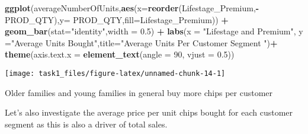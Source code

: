 \documentclass[
]{article}
\newenvironment{Shaded}{\begin{snugshade}}{\end{snugshade}}
\newcommand{\AttributeTok}[1]{\textcolor[rgb]{0.13,0.29,0.53}{#1}}
\newcommand{\DecValTok}[1]{\textcolor[rgb]{0.00,0.00,0.81}{#1}}
\newcommand{\FloatTok}[1]{\textcolor[rgb]{0.00,0.00,0.81}{#1}}
\newcommand{\FunctionTok}[1]{\textcolor[rgb]{0.13,0.29,0.53}{\textbf{#1}}}
\newcommand{\NormalTok}[1]{#1}
\newcommand{\SpecialCharTok}[1]{\textcolor[rgb]{0.81,0.36,0.00}{\textbf{#1}}}
\newcommand{\StringTok}[1]{\textcolor[rgb]{0.31,0.60,0.02}{#1}}
\begin{document}
\begin{Shaded}
\begin{Highlighting}[]
\FunctionTok{ggplot}\NormalTok{(averageNumberOfUnits,}\FunctionTok{aes}\NormalTok{(}\AttributeTok{x=}\FunctionTok{reorder}\NormalTok{(Lifestage\_Premium,}\SpecialCharTok{{-}}\NormalTok{PROD\_QTY),}\AttributeTok{y=}\NormalTok{ PROD\_QTY,}\AttributeTok{fill=}\NormalTok{Lifestage\_Premium)) }\SpecialCharTok{+}
  \FunctionTok{geom\_bar}\NormalTok{(}\AttributeTok{stat=}\StringTok{"identity"}\NormalTok{,}\AttributeTok{width =} \FloatTok{0.5}\NormalTok{) }\SpecialCharTok{+} 
  \FunctionTok{labs}\NormalTok{(}\AttributeTok{x =} \StringTok{"Lifestage and Premium"}\NormalTok{, }\AttributeTok{y =}\StringTok{"Average Units Bought"}\NormalTok{,}\AttributeTok{title=}\StringTok{"Average Units Per Customer Segment "}\NormalTok{)}\SpecialCharTok{+}
  \FunctionTok{theme}\NormalTok{(}\AttributeTok{axis.text.x =} \FunctionTok{element\_text}\NormalTok{(}\AttributeTok{angle =} \DecValTok{90}\NormalTok{, }\AttributeTok{vjust =} \FloatTok{0.5}\NormalTok{))}
\end{Highlighting}
\end{Shaded}

\begin{center}\texttt{[image: task1\_files/figure-latex/unnamed-chunk-14-1]} \end{center}

Older families and young families in general buy more chips per customer

Let's also investigate the average price per unit chips bought for each
customer segment as this is also a driver of total sales.
\end{document}
